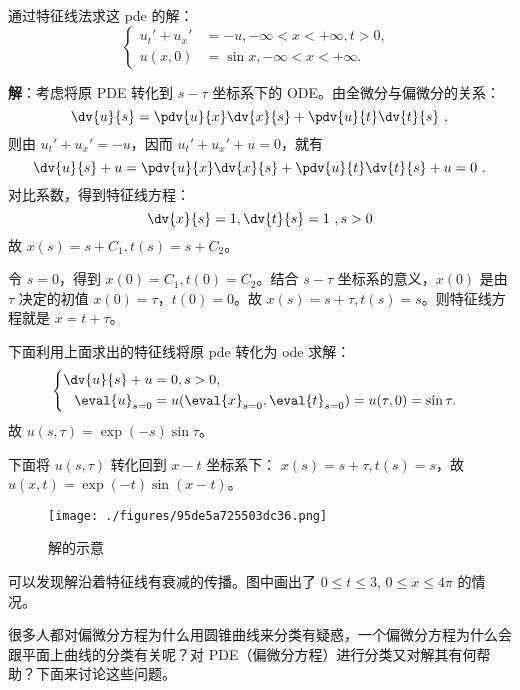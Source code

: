 \begin{example}{}
通过特征线法求这 pde 的解：
$$
\left\{
\begin{aligned}
{u_t'} + {u_x'} &= -u, -\infty < x < +\infty, t > 0, \\
u(x, 0) &= \sin x, -\infty < x < +\infty .
\end{aligned}
\right.
~~
$$

\textbf{解}：考虑将原 PDE 转化到 $s-\tau$ 坐标系下的 ODE。由全微分与偏微分的关系：
$$
\dv{u}{s} = \pdv{u}{x} \dv{x}{s} + \pdv{u}{t} \dv{t}{s}~,
$$
则由 $u_t' + u_x' = -u$，因而 $u_t' + u_x' + u = 0$，就有
$$\dv{u}{s} + u = \pdv{u}{x} \dv{x}{s} + \pdv{u}{t} \dv{t}{s} + u = 0 ~.$$
对比系数，得到特征线方程：
$$\dv{x}{s} = 1, \dv{t}{s} = 1~, s>0$$
故 $x(s) = s+C_1, t(s) = s+C_2$。

令 $s=0$，得到 $x(0) = C_1, t(0) = C_2$。结合 $s-\tau$ 坐标系的意义，$x(0)$ 是由 $\tau$ 决定的初值 $x(0) = \tau$，$t(0)=0$。故 $x(s) = s+\tau, t(s)=s$。则特征线方程就是 $x = t+\tau$。

下面利用上面求出的特征线将原 pde 转化为 ode 求解：
$$
\left\{
\begin{aligned}
\dv{u}{s} +u &= 0, s>0, \\
\eval{u}_{s=0} &= u(\eval{x}_{s=0}, \eval{t}_{s=0}) = u(\tau, 0) = \sin \tau .
\end{aligned}    
\right.~~$$
故 $u(s,\tau) = \exp(-s) \sin \tau$。

下面将 $u(s, \tau)$ 转化回到 $x-t$ 坐标系下：
$x(s) = s + \tau, t(s) = s$，故 $u(x, t) = \exp(-t)\sin(x-t) $。

\begin{figure}[ht]
\centering
\texttt{[image: ./figures/95de5a725503dc36.png]}
\caption{解的示意} \label{fig_chacur_2}
\end{figure}
可以发现解沿着特征线有衰减的传播。图中画出了 $0\le t\le3$, $0\le x \le 4 \pi$ 的情况。
\end{example}



























很多人都对偏微分方程为什么用圆锥曲线来分类有疑惑，一个偏微分方程为什么会跟平面上曲线的分类有关呢？对 PDE（偏微分方程）进行分类又对解其有何帮助？下面来讨论这些问题。

